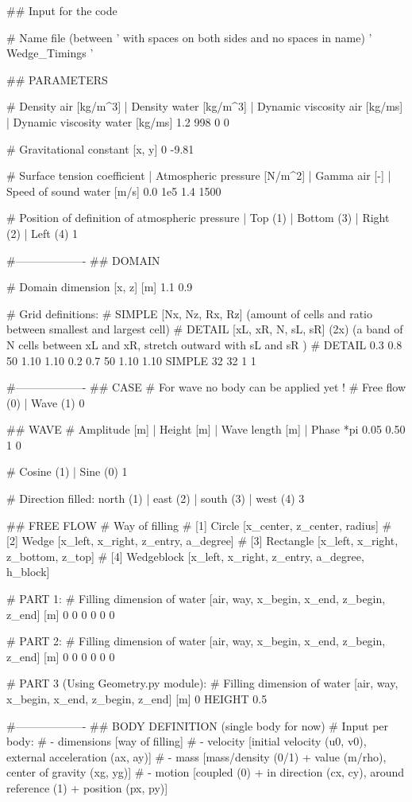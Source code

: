 ## Input for the code

# Name file (between ' with spaces on both sides and no spaces in name)
' Wedge_Timings '

## PARAMETERS

# Density air [kg/m^3] | Density water [kg/m^3] | Dynamic viscosity air [kg/ms] | Dynamic viscosity water [kg/ms]
1.2 998 0 0

# Gravitational constant [x, y]
0 -9.81

# Surface tension coefficient | Atmospheric pressure [N/m^2] | Gamma air [-]	| Speed of sound water [m/s]
0.0 	1e5 	1.4		1500

# Position of definition of atmospheric pressure	| Top (1)	| Bottom (3)	| Right (2)		| Left (4)
1

#-------------------
## DOMAIN

# Domain dimension [x, z] [m]
1.1 0.9

# Grid definitions:
# SIMPLE [Nx, Nz, Rx, Rz] (amount of cells and ratio between smallest and largest cell)
# DETAIL [xL, xR, N, sL, sR] (2x) (a band of N cells between xL and xR, stretch outward with sL and sR )
# DETAIL 0.3 0.8 50 1.10 1.10 0.2 0.7 50 1.10 1.10
SIMPLE 32 32 1 1

#-------------------
## CASE
# For wave no body can be applied yet !
# Free flow (0)	| Wave (1)
0

## WAVE
# Amplitude [m] | Height [m]	| Wave length [m]	| Phase *pi
0.05 	0.50		1		0

# Cosine (1)	| Sine (0)
1

# Direction filled: north (1)	| east (2)	|	south (3)	| west (4)
3

## FREE FLOW
# Way of filling
# [1] Circle        [x_center, z_center, radius]
# [2] Wedge         [x_left, x_right, z_entry, a_degree]
# [3] Rectangle     [x_left, x_right, z_bottom, z_top]
# [4] Wedgeblock    [x_left, x_right, z_entry, a_degree, h_block]

# PART 1:
# Filling dimension of water [air, way, x_begin, x_end, z_begin, z_end] [m]
0 0 0 0 0 0

# PART 2:
# Filling dimension of water [air, way, x_begin, x_end, z_begin, z_end] [m]
0 0 0 0 0 0

# PART 3 (Using Geometry.py module):
# Filling dimension of water [air, way, x_begin, x_end, z_begin, z_end] [m]
0 HEIGHT 0.5

#-------------------
## BODY DEFINITION (single body for now)
# Input per body:
# - dimensions      [way of filling]
# - velocity        [initial velocity (u0, v0), external acceleration (ax, ay)]
# - mass            [mass/density (0/1) + value (m/rho), center of gravity (xg, yg)]
# - motion          [coupled (0) + in direction (cx, cy), around reference (1) + position (px, py)]

